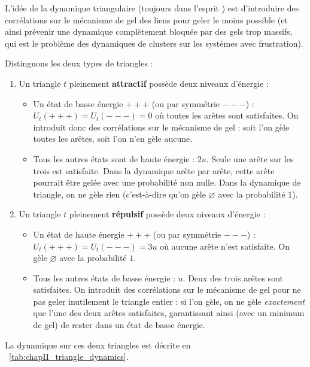 L'idée de la dynamique triangulaire (toujours dans l'esprit \KBD{}) est d'introduire des corrélations sur le mécanisme de gel des liens pour geler le moins possible (et ainsi prévenir une dynamique complètement bloquée par des gels trop massifs, qui est le problème des dynamiques de clusters sur les systèmes avec frustration).

Distinguons les deux types de triangles :
\begin{enumerate}
    \item Un triangle $t$ pleinement \textbf{attractif} possède deux niveaux d'énergie :
    \begin{itemize}
        \item Un état de basse énergie $+++$ (ou par symmétrie $---$) : $U_t(+++)=U_t(---) = 0$ où toutes les arêtes sont satisfaites. On introduit donc des corrélations sur le mécanisme de gel : soit l'on gèle toutes les arêtes, soit l'on n'en gèle aucune.
        \item Tous les autres états sont de haute énergie : $2u$. Seule une arête sur les trois est satisfaite. Dans la dynamique arête par arête, cette arête pourrait être gelée avec une probabilité non nulle. Dans la dynamique de triangle, on ne gèle rien (c'est-à-dire qu'on gèle $\varnothing$ avec la probabilité $1$).
    \end{itemize}
    \item Un triangle $t$ pleinement \textbf{répulsif} possède deux niveaux d'énergie :
    \begin{itemize}
        \item Un état de haute énergie $+++$ (ou par symmétrie $---$) : $U_t(+++)=U_t(---) = 3u$ où aucune arête n'est satisfaite. On gèle $\varnothing$ avec la probabilité $1$.
        \item Tous les autres états de basse énergie : $u$. Deux des trois arêtes sont satisfaites. On introduit des corrélations sur le mécanisme de gel pour ne pas geler inutilement le triangle entier : si l'on gèle, on ne gèle \emph{exactement} que l'une des deux arêtes satisfaites, garantissant ainsi (avec un minimum de gel) de rester dans un état de basse énergie.
    \end{itemize}
\end{enumerate}

La dynamique sur ces deux triangles est décrite en \Tab~\ref{tab:chapII_triangle_dynamics}.


